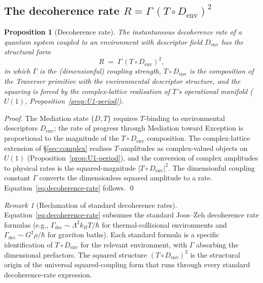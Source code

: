 \documentclass[11pt,a4paper]{article}
\newtheorem{proposition}[theorem]{Proposition}
\theoremstyle{definition}
\theoremstyle{remark}
\newtheorem{remark}[theorem]{Remark}
\begin{document}
\subsection{The decoherence rate \texorpdfstring{$R = \Gamma\,(T \circ D_{\mathrm{env}})^{2}$}{R = Gamma (T comp Denv)^2}}\label{subsec:decoherence-rate}

\begin{proposition}[Decoherence rate]\label{prop:decoherence-rate}
The instantaneous decoherence rate of a quantum system coupled to an environment with descriptor field $D_{\mathrm{env}}$ has the structural form
\begin{equation}\label{eq:decoherence-rate}
R \;=\; \Gamma\,(T \circ D_{\mathrm{env}})^{2},
\end{equation}
in which $\Gamma$ is the (dimensionful) coupling strength, $T \circ D_{\mathrm{env}}$ is the composition of the Traverser primitive with the environmental descriptor structure, and the squaring is forced by the complex-lattice realisation of $T$'s operational manifold ($U(1)$, Proposition~\ref{prop:U1-period}).
\end{proposition}

\begin{proof}
The Mediation state $\{D,T\}$ requires $T$-binding to environmental descriptors $D_{\mathrm{env}}$; the rate of progress through Mediation toward Exception is proportional to the magnitude of the $T \circ D_{\mathrm{env}}$ composition. The complex-lattice extension of \S\ref{sec:complex} realises $T$-amplitudes as complex-valued objects on $U(1)$ (Proposition~\ref{prop:U1-period}), and the conversion of complex amplitudes to physical rates is the squared-magnitude $|T \circ D_{\mathrm{env}}|^{2}$. The dimensionful coupling constant $\Gamma$ converts the dimensionless squared amplitude to a rate. Equation~\eqref{eq:decoherence-rate} follows. \qed
\end{proof}

\begin{remark}[Reclamation of standard decoherence rates]\label{rem:decoherence-rate-reclaim}
Equation~\eqref{eq:decoherence-rate} subsumes the standard Joos--Zeh decoherence rate formulas (e.g., $\Gamma_{\mathrm{dec}} \sim \Lambda^{2} k_{B} T/\hbar$ for thermal-collisional environments and $\Gamma_{\mathrm{dec}} \sim G^{2}\rho/\hbar$ for graviton baths). Each standard formula is a specific identification of $T \circ D_{\mathrm{env}}$ for the relevant environment, with $\Gamma$ absorbing the dimensional prefactors. The squared structure $(T \circ D_{\mathrm{env}})^{2}$ is the structural origin of the universal squared-coupling form that runs through every standard decoherence-rate expression.
\end{remark}
\end{document}
